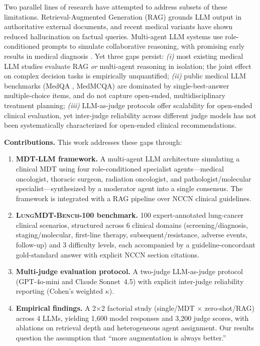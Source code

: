 \documentclass[final, 11pt, 3p]{elsarticle}
\newcommand{\MDTLLM}{\textsc{MDT-LLM}}
\newcommand{\BENCH}{\textsc{LungMDT-Bench-100}}
\begin{document}
Two parallel lines of research have attempted to address subsets of
these limitations. Retrieval-Augmented Generation (RAG) \cite{Lewis2020}
grounds LLM output in authoritative external documents, and recent
medical variants \cite{Zakka2024,Jeong2024} have shown reduced
hallucination on factual queries. Multi-agent LLM systems
\cite{Hong2024MetaGPT,Wu2024AutoGen} use role-conditioned prompts to
simulate collaborative reasoning, with promising early results in
medical diagnosis \cite{Tang2023MedAgents,Schmidgall2024AgentClinic}.
Yet three gaps persist: \emph{(i)} most existing medical LLM studies
evaluate RAG \emph{or} multi-agent reasoning in isolation; the joint
effect on complex decision tasks is empirically unquantified;
\emph{(ii)} public medical LLM benchmarks (MedQA \cite{Jin2020MedQA},
MedMCQA) are dominated by single-best-answer multiple-choice items,
and do not capture open-ended, multidisciplinary treatment planning;
\emph{(iii)} LLM-as-judge protocols \cite{Zheng2023MTBench,Chiang2024}
offer scalability for open-ended clinical evaluation, yet inter-judge
reliability across different judge models has not been systematically
characterized for open-ended clinical recommendations.

\textbf{Contributions.} This work addresses these gaps through:

\begin{enumerate}
\item \textbf{\MDTLLM{} framework.} A multi-agent LLM architecture
  simulating a clinical MDT using four role-conditioned specialist
  agents---medical oncologist, thoracic surgeon, radiation oncologist,
  and pathologist/molecular specialist---synthesized by a moderator
  agent into a single consensus. The framework is integrated with a
  RAG pipeline over NCCN clinical guidelines.
\item \textbf{\BENCH{} benchmark.} 100 expert-annotated lung-cancer
  clinical scenarios, structured across 6 clinical domains
  (screening/diagnosis, staging/molecular, first-line therapy,
  subsequent/resistance, adverse events, follow-up) and 3 difficulty
  levels, each accompanied by a guideline-concordant gold-standard
  answer with explicit NCCN section citations.
\item \textbf{Multi-judge evaluation protocol.} A two-judge LLM-as-judge
  protocol (GPT-4o-mini and Claude Sonnet~4.5) with explicit inter-judge
  reliability reporting (Cohen's weighted $\kappa$).
\item \textbf{Empirical findings.} A 2$\times$2 factorial study
  (single/MDT $\times$ zero-shot/RAG) across 4 LLMs, yielding 1{,}600
  model responses and 3{,}200 judge scores, with ablations on
  retrieval depth and heterogeneous agent assignment. Our results
  question the assumption that ``more augmentation is always better.''
\end{enumerate}
\end{document}
